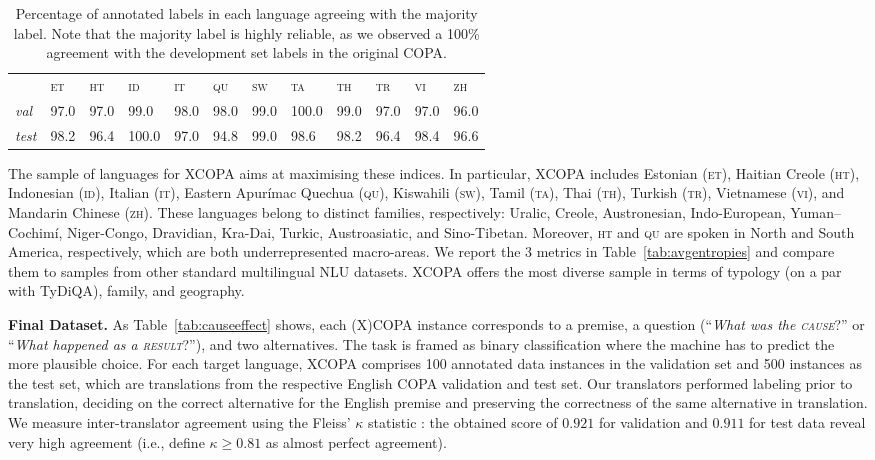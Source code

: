 \documentclass[11pt,a4paper]{article}
\begin{document}
\begin{table*}[!t]
    \def\arraystretch{0.94}
    \centering
    {\small
    \begin{tabularx}{1.0\textwidth}{l|YYYYYYYYYYY}
    \toprule
& \textsc{et} & \textsc{ht} & \textsc{id} & \textsc{it} & \textsc{qu} & \textsc{sw} & \textsc{ta} & \textsc{th} & \textsc{tr} & \textsc{vi} & \textsc{zh}\\
\cmidrule(lr){2-12}
\textit{val} & 97.0 & 97.0 & 99.0 & 98.0 & 98.0 & 99.0 & 100.0 & 99.0 & 97.0 & 97.0 & 96.0\\
\textit{test} &  98.2 & 96.4 & 100.0 & 97.0 & 94.8 & 99.0 & 98.6 & 98.2 & 96.4 & 98.4 & 96.6\\
\bottomrule
    \end{tabularx}}\caption{Percentage of annotated labels in each language agreeing with the majority label. Note that the majority label is highly reliable, as we observed a 100\% agreement with the development set labels in the original COPA.}
    \label{tab:overlap}
    \vspace{-1.5mm}
\end{table*}

The sample of languages for XCOPA aims at maximising these indices. In particular, XCOPA includes Estonian (\textsc{et}), Haitian Creole (\textsc{ht}), Indonesian (\textsc{id}), Italian (\textsc{it}), Eastern Apurímac Quechua (\textsc{qu}), Kiswahili (\textsc{sw}), Tamil (\textsc{ta}), Thai (\textsc{th}), Turkish (\textsc{tr}), Vietnamese (\textsc{vi}), and Mandarin Chinese (\textsc{zh}). These languages belong to distinct families, respectively: Uralic, Creole, Austronesian, Indo-European, Yuman–Cochimí, Niger-Congo, Dravidian, Kra-Dai, Turkic, Austroasiatic, and Sino-Tibetan. Moreover, \textsc{ht} and \textsc{qu} are spoken in North and South America, respectively, which are both underrepresented macro-areas. We report the 3 metrics in Table~\ref{tab:avgentropies} and compare them to samples from other standard multilingual NLU datasets. XCOPA offers the most diverse sample in terms of typology (on a par with TyDiQA), family, and geography. 

\vspace{1.4mm}
\noindent \textbf{Final Dataset.}
As Table~\ref{tab:causeeffect} shows, each (X)COPA instance corresponds to a premise, a question (``\textit{What was the \textsc{cause}}?'' or ``\textit{What happened as a \textsc{result}}?''), and two alternatives. The task is framed as binary classification where the machine has to predict the more plausible choice. For each target language, XCOPA comprises 100 annotated data instances in the validation set and 500 instances as the test set, which are translations from the respective English COPA validation and test set. Our translators performed labeling prior to translation, deciding on the correct alternative for the English premise and preserving the correctness of the same alternative in translation. We measure inter-translator agreement using the Fleiss' $\kappa$ statistic \cite{fleiss1971measuring}: the obtained score of $0.921$ for validation and $0.911$ for test data reveal very high agreement (i.e., \citet{landis1977measurement} define $\kappa\geq0.81$ as almost perfect agreement).
\end{document}
